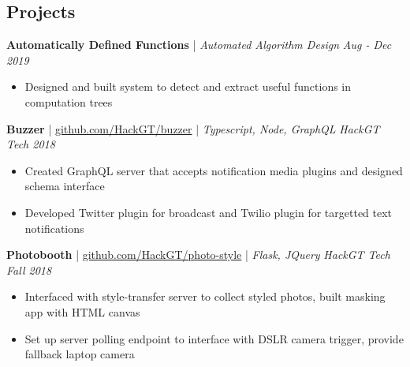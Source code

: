 \subsection*{Projects}
\iftoggle{dense}{}{
    \headerrow
        {\textbf{Perturbome of Graphs of RNNs}}
        {\emph{Sep - Nov 2020}}
    \begin{itemize}
        \item Experimented with network robustness by noising recurrent networks built with \textsc{pytorch-geometric}
    \end{itemize}
    \headerrow
        {\textbf{BERT Representations During Fine-Tuning}}
        {\emph{Sep - Nov 2020}}
    \begin{itemize}
        \item Studied changes in the BERT model during fine-tuning and forgetting using representational analysis
    \end{itemize}
}
\headerrow
    {\textbf{Automatically Defined Functions} | \textit{Automated Algorithm Design}}
    {\emph{Aug - Dec 2019}}
\begin{itemize}
    \item Designed and built system to detect and extract useful functions in computation trees%
\end{itemize}
\iftoggle{dense}{}{
    \headerrow
        {\textbf{Filter Inverter} | \href{https://team-vision2020.github.io}{team-vision2020.github.io}}
        {\emph{Oct - Nov 2018}}
    \begin{itemize}
        \item Unfilter Instagram filters using detection and pseudo-inversion. Created demo combining all models
        \item Designed voting procedure that used nearest neighbor classifier on generated knowledge base
    \end{itemize}
}
\headerrow
    {\textbf{Buzzer} | \href{https://github.com/HackGT/buzzer}{github.com/HackGT/buzzer} |
    \textit{Typescript, Node, GraphQL}}
    {\emph{HackGT Tech 2018}}
\begin{itemize}
    \item Created GraphQL server that accepts notification media plugins and designed schema interface
    \item Developed Twitter plugin for broadcast and Twilio plugin for targetted text notifications
\end{itemize}
\headerrow
    {\textbf{Photobooth} | \href{https://github.com/HackGT/photo-style}{github.com/HackGT/photo-style} |
    \textit{Flask, JQuery}}
    {\emph{HackGT Tech Fall 2018}}
\begin{itemize}
    \item Interfaced with style-transfer server to collect styled photos, built masking app with HTML canvas
    \item Set up server polling endpoint to interface with DSLR camera trigger, provide fallback laptop camera
\end{itemize}

